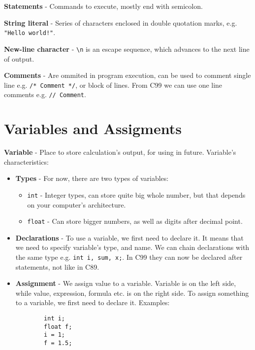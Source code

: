 \documentclass[12pt, openany]{book}
\begin{document}
    \textbf{Statements} - Commands to execute, mostly end with semicolon.

    \bigskip
    \textbf{String literal} - Series of characters enclosed in double quotation marks,
    e.g. \texttt{"Hello world!"}.

    \textbf{New-line character} - \texttt{\textbackslash n} is an escape sequence, which
    advances to the next line of output.

    \textbf{Comments} - Are ommited in program execution, can be used to comment single line
    e.g. \texttt{/* Comment */}, or block of lines. From C99 we can use one line comments
    e.g. \texttt{// Comment}.

    \section{Variables and Assigments}

    \textbf{Variable} - Place to store calculation's output, for using in future.
    Variable's characteristics:
    \begin{itemize}
        \item 
        \textbf{Types} - For now, there are two types of variables:
        \begin{itemize}
            \item \texttt{int} - Integer types, can store quite big whole number, but
            that depends on your computer's architecture.
            \item \texttt{float} - Can store bigger numbers, as well as digits after
            decimal point.
        \end{itemize}

        \item 
        \textbf{Declarations} - To use a variable, we first need to declare it. It
        means that we need to specify variable's type, and name. We can chain declarations
        with the same type e.g. \texttt{int i, sum, x;}. In C99 they can now be declared
        after statements, not like in C89.
        
        \item
        \textbf{Assignment} - We assign value to a variable. Variable is on the left
        side, while value, expression, formula etc. is on the right side. To assign
        something to a variable, we first need to declare it. Examples:
        \begin{lstlisting}
        int i;
        float f;
        i = 1;
        f = 1.5;
        \end{lstlisting}
    \end{itemize}
\end{document}
